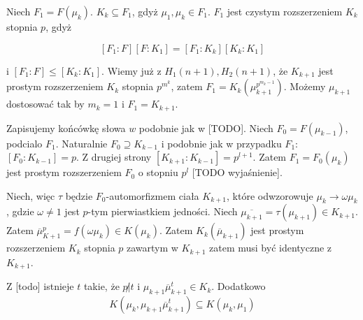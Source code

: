 Niech $F_1 = F \left( \mu_k \right)$. $K_k \subseteq F_1$, gdyż $\mu_1, \mu_k
\in F_1$. $F_1$ jest czystym rozszerzeniem $K_k$ stopnia $p$, gdyż

\[
\left[F_1:F\right]\left[F:K_1 \right] =
\left[F_1:K_k\right]\left[K_k:K_1\right]
\]

i $\left[F_1:F\right] \leq \left[K_k:K_1\right]$. Wiemy już z $H_1(n+1),
H_2(n+1)$, że $K_{k+1}$ jest prostym rozszerzeniem $K_k$ stopnia $p^{m^k}$,
zatem $F_1 = K_k \left(\mu_{k+1}^{p^{m_k -1}} \right)$. Możemy $\mu_{k+1}$
dostosować tak by $m_k = 1$ i $F_1 = K_{k+1}$.

Zapisujemy końcówkę słowa $w$ podobnie jak w [TODO]. Niech $F_0 = F \left(
\mu_{k-1} \right)$, podcialo $F_1$. Naturalnie $F_0 \supseteq K_{k-1}$ i
podobnie jak w przypadku $F_1$: $\left[F_0:K_{k-1} \right] = p$. Z drugiej
strony $\left[ K_{k+1} : K_{k-1} \right] = p^{l+1}$.
Zatem $F_1 = F_0 \left(\mu_k \right)$ jest prostym rozszerzeniem $F_0$ o stopniu
$p^l$ [TODO wyjaśnienie].

Niech, więc $\tau$ będzie $F_0$-automorfizmem ciała $K_{k+1}$, które odwzorowuje
$\mu_k \rightarrow \omega \mu_k$, gdzie $\omega \neq 1$ jest $p$-tym
pierwiastkiem jedności. Niech $\overline{\mu_{k+1}} = \tau \left( \mu_{k+1}
\right) \in K_{k+1}$. Zatem $\overline{\mu}_{K+1}^p = f \left( \omega \mu_k
\right) \in K \left( \mu_k \right)$.
Zatem $K_k \left(\overline{\mu}_{k+1} \right)$ jest prostym rozszerzeniem $K_k$
stopnia $p$ zawartym w $K_{k+1}$ zatem musi być identyczne z $K_{k+1}$.

Z [todo] istnieje $t$ takie, że $p \not | t$ i
$\mu_{k+1} \overline{\mu}_{k+1}^t \in K_k$. Dodatkowo
\[ K \left( \mu_k, \mu_{k+1} \overline{\mu}_{k+1}^t \right)
  \subseteq
  K \left( \mu_k, \mu_1 \right)
\]

